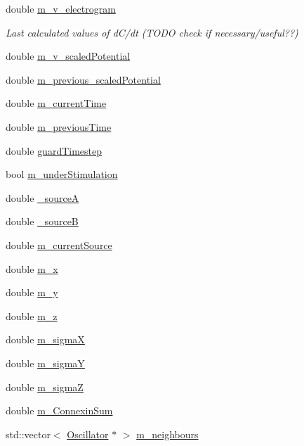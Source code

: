 \begin{DoxyCompactItemize}
double \hyperlink{class_oscillator_ab65a59d93c248616facbd1f01b3c2b87}{m\+\_\+v\+\_\+electrogram}
\begin{DoxyCompactList}\small\item\em Last calculated values of d\+C/dt (T\+O\+D\+O check if necessary/useful??) \end{DoxyCompactList}\item 
double \hyperlink{class_oscillator_aae4aa22ad331c19871be91d7cc5ceafa}{m\+\_\+v\+\_\+scaled\+Potential}
\item 
double \hyperlink{class_oscillator_a45a1214b84b342e4ee078d218112f001}{m\+\_\+previous\+\_\+scaled\+Potential}
\item 
double \hyperlink{class_oscillator_abe68e99fc990a44b9bd234751eec0f24}{m\+\_\+current\+Time}
\item 
double \hyperlink{class_oscillator_ab97f31715485a24f49c98a01caa9f2d8}{m\+\_\+previous\+Time}
\item 
double \hyperlink{class_oscillator_a4db30c0516d078b69426aad65bf13022}{guard\+Timestep}
\item 
bool \hyperlink{class_oscillator_aeaa03f804f9d13f27635b94ea7a6bd32}{m\+\_\+under\+Stimulation}
\item 
double \hyperlink{class_oscillator_a968627d069d5f0c44d8134718a01237f}{\+\_\+source\+A}
\item 
double \hyperlink{class_oscillator_a5a144fd5dd7cbcbfc47d7c9013d330b8}{\+\_\+source\+B}
\item 
double \hyperlink{class_oscillator_a766694982f9a1f8ed7013828089587f7}{m\+\_\+current\+Source}
\item 
double \hyperlink{class_oscillator_abd8b2a7267f85cae787a0bc77d1f5a5a}{m\+\_\+x}
\item 
double \hyperlink{class_oscillator_a6936c789a75680f0486c817af4fce202}{m\+\_\+y}
\item 
double \hyperlink{class_oscillator_ae00491a4783797fb6edb9c3d5317a6ad}{m\+\_\+z}
\item 
double \hyperlink{class_oscillator_aa0fe6259ca35433e3bd0dbac2d0ead65}{m\+\_\+sigma\+X}
\item 
double \hyperlink{class_oscillator_a253c7652df4789833c9f940c3278036d}{m\+\_\+sigma\+Y}
\item 
double \hyperlink{class_oscillator_af8ba90eb71c73ac1c789d569e7e2f92f}{m\+\_\+sigma\+Z}
\item 
double \hyperlink{class_oscillator_a952e781ffe848b06b7b511c54f1d090c}{m\+\_\+\+Connexin\+Sum}
\item 
std\+::vector$<$ \hyperlink{class_oscillator}{Oscillator} $\ast$ $>$ \hyperlink{class_oscillator_ac6add7bad19c62071ad1ce651b815e4e}{m\+\_\+neighbours}

\end{DoxyCompactItemize}
